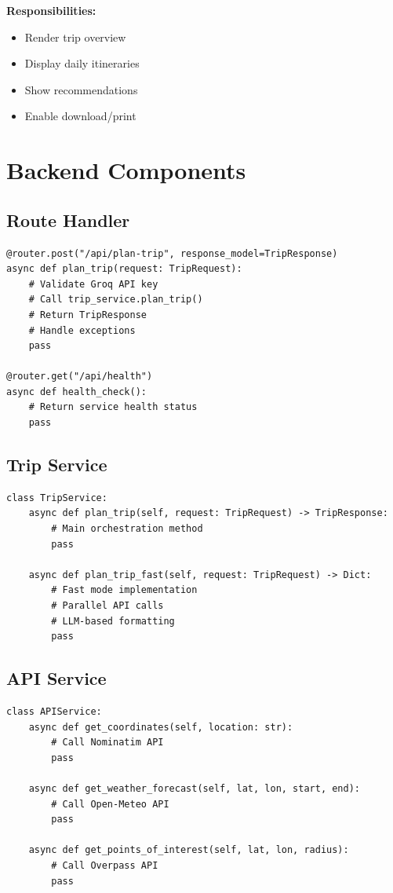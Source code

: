 \documentclass[12pt,a4paper]{report}
\begin{document}
\textbf{Responsibilities:}
\begin{itemize}
    \item Render trip overview
    \item Display daily itineraries
    \item Show recommendations
    \item Enable download/print
\end{itemize}

\section{Backend Components}

\subsection{Route Handler}

\begin{lstlisting}[style=pythonstyle, caption={API Endpoints}]
@router.post("/api/plan-trip", response_model=TripResponse)
async def plan_trip(request: TripRequest):
    # Validate Groq API key
    # Call trip_service.plan_trip()
    # Return TripResponse
    # Handle exceptions
    pass

@router.get("/api/health")
async def health_check():
    # Return service health status
    pass
\end{lstlisting}

\subsection{Trip Service}

\begin{lstlisting}[style=pythonstyle, caption={Trip Service Methods}]
class TripService:
    async def plan_trip(self, request: TripRequest) -> TripResponse:
        # Main orchestration method
        pass
    
    async def plan_trip_fast(self, request: TripRequest) -> Dict:
        # Fast mode implementation
        # Parallel API calls
        # LLM-based formatting
        pass
\end{lstlisting}

\subsection{API Service}

\begin{lstlisting}[style=pythonstyle, caption={API Service Methods}]
class APIService:
    async def get_coordinates(self, location: str):
        # Call Nominatim API
        pass
    
    async def get_weather_forecast(self, lat, lon, start, end):
        # Call Open-Meteo API
        pass
    
    async def get_points_of_interest(self, lat, lon, radius):
        # Call Overpass API
        pass
\end{lstlisting}
\end{document}
